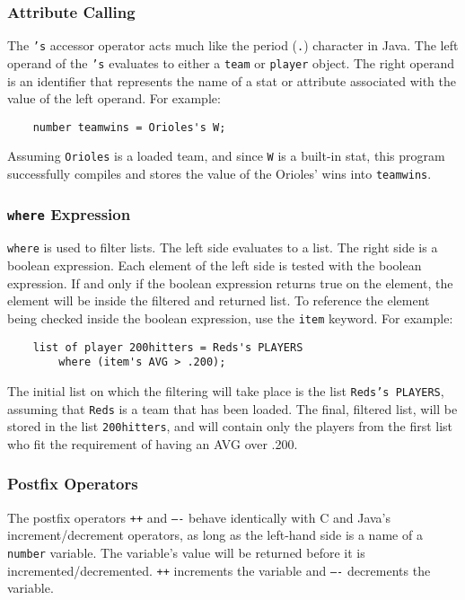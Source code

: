 \subsubsection{Attribute Calling}
The \texttt{'s} accessor operator acts much like the period
(\texttt{.}) character in Java. The left operand of the \texttt{'s}
evaluates to either a \texttt{team} or \texttt{player} object. The
right operand is an identifier that represents the name of a stat or
attribute associated with the value of the left operand. For example:
\begin{verbatim}
    number teamwins = Orioles's W;
\end{verbatim}
Assuming \texttt{Orioles} is a loaded team, and since \texttt{W} is a
built-in stat, this program successfully compiles and stores the value
of the Orioles' wins into \texttt{teamwins}.

\subsubsection{\texttt{where} Expression}
\texttt{where} is used to filter lists. The left side evaluates to a
list. The right side is a boolean expression. Each element of the left
side is tested with the boolean expression. If and only if the boolean
expression returns true on the element, the element will be inside the
filtered and returned list. To reference the element being checked
inside the boolean expression, use the \texttt{item} keyword. For
example:

\begin{verbatim}
    list of player 200hitters = Reds's PLAYERS 
        where (item's AVG > .200);
\end{verbatim}

The initial list on which the filtering will take place is the list \texttt{Reds's PLAYERS}, assuming that \texttt{Reds} is a team that has been loaded. The final, filtered list, will be stored in the list \texttt{200hitters}, and will contain only the players from the first list who fit the requirement of having an AVG over .200.

\subsubsection{Postfix Operators}
The postfix operators \texttt{++} and \texttt{----} behave identically with C and Java's increment/decrement operators, as long as the left-hand side is a name of a \texttt{number} variable. The variable's value will be returned before it is incremented/decremented. \texttt{++} increments the variable and \texttt{----} decrements the variable.

